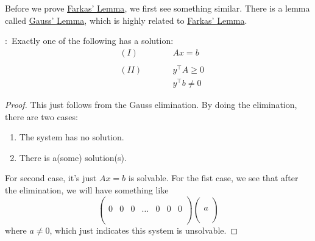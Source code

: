 Before we prove \hyperref[lma:Farkas-lemma]{Farkas' Lemma}, we first see something similar. There is a lemma called \hyperref[lma:Gauss-lemma]{Gauss' Lemma}, which is
highly related to \hyperref[lma:Farkas-lemma]{Farkas' Lemma}.
\begin{lemma}\label{lma:Gauss-lemma}
	\(\colon\) Exactly one of the following has a solution\(\colon\)
	\[
		\begin{alignedat}{3}
			& (I) \qquad&& Ax = b       \\\\
			& (II) \qquad&& y^{\top}A\geq 0 \\
			&      && y^{\top}b\neq  0
		\end{alignedat}
	\]
\end{lemma}
\begin{proof}
	This just follows from the Gauss elimination. By doing the elimination, there are two cases\(\colon\)
	\begin{enumerate}
		\item The system has no solution.
		\item There is a(some) solution(s).
	\end{enumerate}

	For second case, it's just \(Ax = b\) is solvable.  For the fist case, we see that after the elimination, we will have something like
	\[
		\begin{pmatrix}
			  &   &   &        &   &   &   \\
			  &   &   &        &   &   &   \\
			0 & 0 & 0 & \ldots & 0 & 0 & 0 \\
			  &   &   &        &   &   &   \\
			  &   &   &        &   &   &   \\
		\end{pmatrix}
		\begin{pmatrix}
			\\
			\\
			a \\
			\\
			\\
		\end{pmatrix}
	\]
	where \(a\neq 0\), which just indicates this system is unsolvable.
\end{proof}

